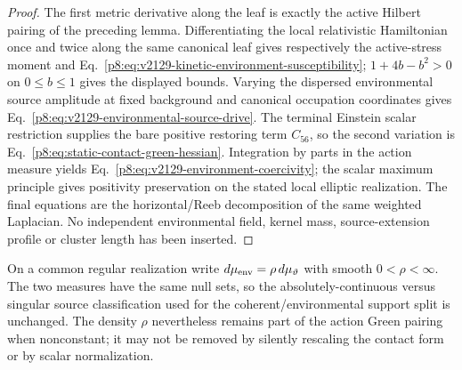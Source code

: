 \documentclass[12pt,a4paper]{article}
\begin{document}
\begin{proof}
The first metric derivative along the leaf is exactly the active Hilbert
pairing of the preceding lemma.  Differentiating the local relativistic
Hamiltonian once and twice along the same canonical leaf gives respectively
the active-stress moment and Eq.~\eqref{p8:eq:v2129-kinetic-environment-susceptibility};
$1+4b-b^2>0$ on $0\le b\le1$ gives the displayed bounds.  Varying the
dispersed environmental source amplitude at fixed background and canonical
occupation coordinates gives Eq.~\eqref{p8:eq:v2129-environmental-source-drive}.
The terminal Einstein scalar restriction supplies the bare positive restoring
term $C_{56}$, so the second variation is
Eq.~\eqref{p8:eq:static-contact-green-hessian}.  Integration by parts in the
action measure yields Eq.~\eqref{p8:eq:v2129-environment-coercivity}; the scalar
maximum principle gives positivity preservation on the stated local elliptic
realization.  The final equations are the horizontal/Reeb decomposition of the
same weighted Laplacian.  No independent environmental field, kernel mass,
source-extension profile or cluster length has been inserted.
\end{proof}

\begin{remark}
\label{p8:rem:v2129-environment-measure-transport}
On a common regular realization write
$d\mu_{\rm env}=\rho\,d\mu_\vartheta$ with smooth $0<\rho<\infty$.  The two
measures have the same null sets, so the absolutely-continuous versus singular
source classification used for the coherent/environmental support split is
unchanged.  The density $\rho$ nevertheless remains part of the action Green
pairing when nonconstant; it may not be removed by silently rescaling the
contact form or by scalar normalization.
\end{remark}
\end{document}
